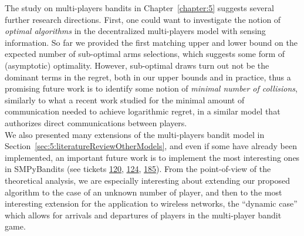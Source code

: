The study on multi-players bandits in Chapter~\ref{chapter:5} suggests several further research directions.
First, one could want to investigate the notion of \emph{optimal algorithms} in the decentralized multi-players model with sensing information.
So far we provided the first matching upper and lower bound on the expected number of sub-optimal arms selections, which suggests some form of (asymptotic) optimality.
However, sub-optimal draws turn out not be the dominant terms in the regret, both in our upper bounds and in practice, thus a promising future work is to identify some notion of \emph{minimal number of collisions}, similarly to what a recent work \cite{wang2019distributed} studied for the minimal amount of communication needed to achieve logarithmic regret, in a similar model that authorizes direct communications between players.
\\
\indent
We also presented many extensions of the multi-players bandit model in Section~\ref{sec:5:literatureReviewOtherModels},
and even if some have already been implemented,
an important future work is to implement the most interesting ones in SMPyBandits
(see tickets \href{https://github.com/SMPyBandits/SMPyBandits/issues/120}{120}, \href{https://github.com/SMPyBandits/SMPyBandits/issues/124}{124}, \href{https://github.com/SMPyBandits/SMPyBandits/issues/185}{185}).
From the point-of-view of the theoretical analysis, we are especially interesting about extending our proposed algorithm \MCTopM{} to the case of an unknown number of player, and then to the most interesting extension for the application to wireless networks, the ``dynamic case'' which allows for arrivals and departures of players in the multi-player bandit game.
%




